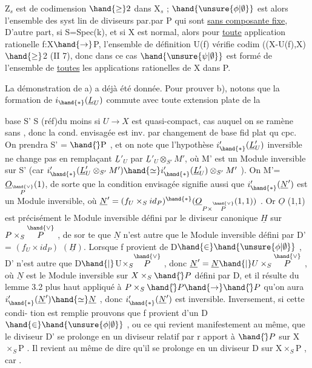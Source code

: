 
Z$_s$ est de codimension $\hand{\geq} 2$ dans X$_s$ ; 
$\hand{\unsure{\phi|\emptyset}}$ est alors l'ensemble des  syst lin de diviseurs par.par P qui sont
\uline{sans composante fixe},  D'autre part, si
S=Spec(k), et si X est normal, alors pour \uline{toute} application rationelle
f:X$\hand{\to}$P, l'ensemble de définition U(f) vérifie codim ((X-U(f),X)$\hand{\geq}$2
(II 7), donc dans ce cas $\hand{\unsure{\psi|\emptyset}}$ est formé de l'ensemble de \uline{toutes} les
applications rationelles de X dans P.

La démonstration de a) a déjà été donnée. Pour prouver b), notons
que la formation de $i_{\hand{*}}(\underline{L}_U)$ commute avec toute extension plate de la

base S' \quad S (réf)du moins si $U\to X$ est quasi-compact, cas auquel on se ramène sans , donc la cond. envisagée est inv. par 
 changement de base fid plat qu cpc. On
prendra S' = $\hand{\check{}}\mathrm{P}$ , et on note que l'hypothèse $i'_{\hand{*}}(\underline{L}'_U)$ inversible ne
change pas en remplaçant $\underline{L}'_U$ par $\underline{L}'_U\otimes_{S'}M'$, où M' est un Module inversible
sur S' (car $i'_{\hand{*}}(\underline{L}'_U\otimes_{S'}M')\hand{\simeq} i'_{\hand{*}}(\underline{L}'_U)\otimes_{S'}M'$ ). On  M'= $\underline{O}_{\overset{\hand{\vee}}{P}}(1)$, de
sorte que la condition envisagée signifie aussi que $i'_{\hand{*}}(\underline{N}')$ est un Module
inversible, où $\underline{N}'= (f_U\times_S id_P)^{\hand{*}}(\underline{O}_{P\times\overset{\hand{\vee}}{P}}(1,1))$ . Or $\underline{O}$ (1,1) est précisément
le Module inversible défini par le diviseur canonique $\underline{H}$ sur $P\times_S\overset{\hand{\vee}}{P}$ , de sor%
te que $\underline{N}$ n'est autre que le Module inversible défini par \qquad D' =
$(f_U\times id_P)$ $(\underline{H})$.  Lorsque f provient de D$\hand{\in}\hand{\unsure{\phi|\emptyset}}$ , 
D' n'est autre que D$\hand{|}$U$\times_S\overset{\hand{\vee}}{P}$ ,  donc $\underline{N}' = \underline{N}\hand{|}U\times_S\overset{\hand{\vee}}{P}$ ,
où $\underline{N}$ est le Module inversible sur $X\times_S\hand{\check{}}P$ défini par D, et il résulte
du lemme 3.2 plus haut  appliqué à $P\times_S\hand{\check{}}P\hand{\to}\hand{\check{}}P$ qu'on aura
$i'_{\hand{*}}(\underline{N}')\hand{\simeq}\underline{N}$ , donc $i'_{\hand{*}}(\underline{N}')$ est inversible. Inversement, si cette condi-%
tion est remplie prouvons que f provient d'un D$\hand{\in}\hand{\unsure{\phi|\emptyset}}$ , ou ce qui revient
manifestement au même, que le diviseur D' se prolonge en un diviseur 
 relatif par r apport  à $\hand{\check{}}P$ sur X$\times_S$P . Il  revient au même
de dire qu'il se prolonge en un diviseur  D sur X$\times_S$P , car .

